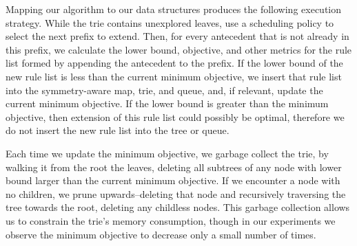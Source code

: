 Mapping our algorithm to our data structures produces the following execution strategy.
While the trie contains unexplored leaves, use a scheduling policy to select
the next prefix to extend.
Then, for every antecedent that is not already in this prefix, we calculate the lower bound,
objective, and other metrics for the rule list formed by appending the antecedent to the prefix.
If the lower bound of the new rule list is less than the current minimum objective, we insert that
rule list into the symmetry-aware map, trie, and queue, and, if relevant, update the
current minimum objective.
If the lower bound is greater than the minimum objective,
then extension of this rule list could possibly be optimal,
therefore we do not insert the new rule list into the tree or queue.

Each time we update the minimum objective, we garbage collect the trie, by walking it
from the root the leaves, deleting all subtrees of any node with lower bound larger than the current
minimum objective. If we encounter a node with no children, we prune upwards--deleting that
node and recursively traversing the tree towards the root, deleting any childless nodes.
This garbage collection allows us to constrain the trie's memory consumption, though in our
experiments we observe the minimum objective to decrease only a small number of times.

